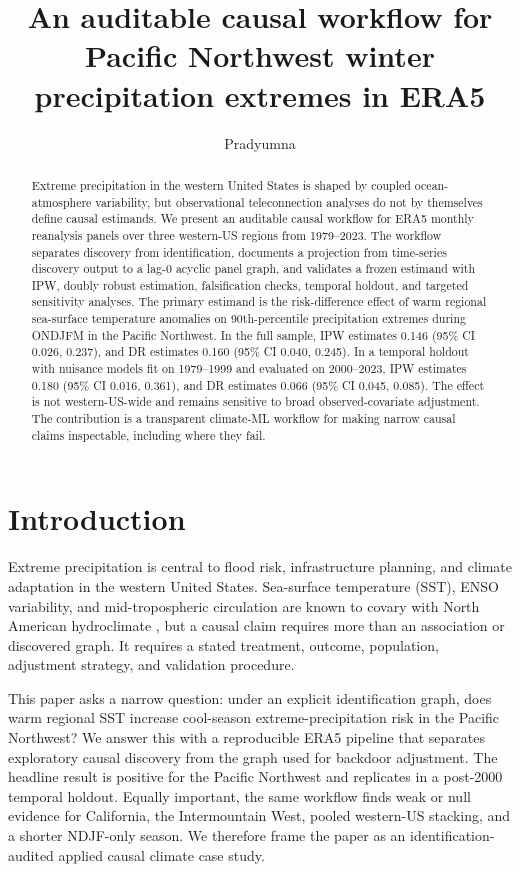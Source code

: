 \documentclass{article}
\title{An auditable causal workflow for Pacific Northwest winter precipitation extremes in ERA5}
\author{Pradyumna}
\begin{document}
\maketitle

\begin{abstract}
Extreme precipitation in the western United States is shaped by coupled ocean-atmosphere variability, but observational teleconnection analyses do not by themselves define causal estimands. We present an auditable causal workflow for ERA5 monthly reanalysis panels over three western-US regions from 1979--2023. The workflow separates discovery from identification, documents a projection from time-series discovery output to a lag-0 acyclic panel graph, and validates a frozen estimand with IPW, doubly robust estimation, falsification checks, temporal holdout, and targeted sensitivity analyses. The primary estimand is the risk-difference effect of warm regional sea-surface temperature anomalies on 90th-percentile precipitation extremes during ONDJFM in the Pacific Northwest. In the full sample, IPW estimates 0.146 (95\% CI 0.026, 0.237), and DR estimates 0.160 (95\% CI 0.040, 0.245). In a temporal holdout with nuisance models fit on 1979--1999 and evaluated on 2000--2023, IPW estimates 0.180 (95\% CI 0.016, 0.361), and DR estimates 0.066 (95\% CI 0.045, 0.085). The effect is not western-US-wide and remains sensitive to broad observed-covariate adjustment. The contribution is a transparent climate-ML workflow for making narrow causal claims inspectable, including where they fail.
\end{abstract}

\section{Introduction}

Extreme precipitation is central to flood risk, infrastructure planning, and climate adaptation in the western United States. Sea-surface temperature (SST), ENSO variability, and mid-tropospheric circulation are known to covary with North American hydroclimate \citep{ropelewski1986north,dettiger2011climate}, but a causal claim requires more than an association or discovered graph. It requires a stated treatment, outcome, population, adjustment strategy, and validation procedure.

This paper asks a narrow question: under an explicit identification graph, does warm regional SST increase cool-season extreme-precipitation risk in the Pacific Northwest? We answer this with a reproducible ERA5 pipeline \citep{hersbach2020era5} that separates exploratory causal discovery from the graph used for backdoor adjustment. The headline result is positive for the Pacific Northwest and replicates in a post-2000 temporal holdout. Equally important, the same workflow finds weak or null evidence for California, the Intermountain West, pooled western-US stacking, and a shorter NDJF-only season. We therefore frame the paper as an identification-audited applied causal climate case study.
\end{document}
